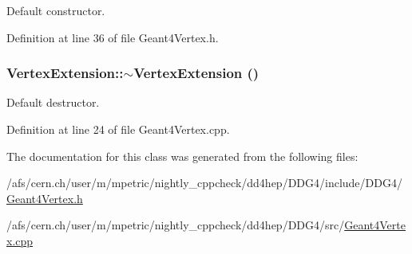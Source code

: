 Default constructor. 

Definition at line 36 of file Geant4Vertex.h.\hypertarget{class_d_d4hep_1_1_simulation_1_1_vertex_extension_ada5f206230fe61718826c4cfe8eb7e9e}{
\subsubsection[{$\sim$VertexExtension}]{\setlength{\rightskip}{0pt plus 5cm}VertexExtension::$\sim$VertexExtension ()}}
\label{class_d_d4hep_1_1_simulation_1_1_vertex_extension_ada5f206230fe61718826c4cfe8eb7e9e}


Default destructor. 

Definition at line 24 of file Geant4Vertex.cpp.

The documentation for this class was generated from the following files:\begin{DoxyCompactItemize}
\item 
/afs/cern.ch/user/m/mpetric/nightly\_\-cppcheck/dd4hep/DDG4/include/DDG4/\hyperlink{_geant4_vertex_8h}{Geant4Vertex.h}\item 
/afs/cern.ch/user/m/mpetric/nightly\_\-cppcheck/dd4hep/DDG4/src/\hyperlink{_geant4_vertex_8cpp}{Geant4Vertex.cpp}\end{DoxyCompactItemize}
